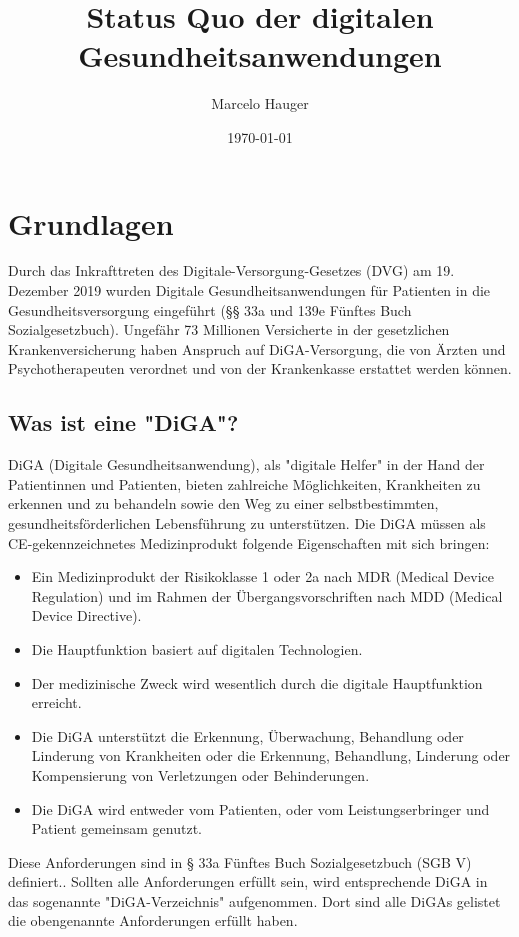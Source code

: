 \documentclass{article}
\title{Status Quo der digitalen Gesundheitsanwendungen}
\author{Marcelo Hauger}
\date{\today}
\begin{document}
	\maketitle
	\newpage
	\tableofcontents
	\newpage
	\section{Grundlagen}
		Durch das Inkrafttreten des Digitale-Versorgung-Gesetzes (DVG) am 19. Dezember 2019 wurden Digitale Gesundheitsanwendungen für Patienten in die Gesundheitsversorgung eingeführt (§§ 33a und 139e Fünftes Buch Sozialgesetzbuch). Ungefähr 73 Millionen Versicherte in der gesetzlichen Krankenversicherung haben Anspruch auf DiGA-Versorgung, die von Ärzten und Psychotherapeuten verordnet und von der Krankenkasse erstattet werden können.
		\subsection{Was ist eine "DiGA"?}
			DiGA (Digitale Gesundheitsanwendung), als "digitale Helfer" in der Hand der Patientinnen und Patienten, bieten zahlreiche Möglichkeiten, Krankheiten zu erkennen und zu behandeln sowie den Weg zu einer selbstbestimmten, gesundheitsförderlichen Lebensführung zu unterstützen. Die DiGA müssen als CE-gekennzeichnetes Medizinprodukt folgende Eigenschaften mit sich bringen:
			\begin{itemize}
				\item Ein Medizinprodukt der Risikoklasse 1 oder 2a nach MDR (Medical Device Regulation) und im Rahmen der Übergangsvorschriften nach MDD (Medical Device Directive).
				\item Die Hauptfunktion basiert auf digitalen Technologien.
				\item Der medizinische Zweck wird wesentlich durch die digitale Hauptfunktion erreicht.
				\item Die DiGA unterstützt die Erkennung, Überwachung, Behandlung oder Linderung von Krankheiten oder die Erkennung, Behandlung, Linderung oder Kompensierung von Verletzungen oder Behinderungen.
				\item Die DiGA wird entweder vom Patienten, oder vom Leistungserbringer und Patient gemeinsam genutzt.
			\end{itemize}  
			Diese Anforderungen sind in § 33a Fünftes Buch Sozialgesetzbuch (SGB V) definiert.\cite[vgl. Was ist eine DiGA?]{wissenswertes-diga}. Sollten alle Anforderungen erfüllt sein, wird entsprechende DiGA in das sogenannte "DiGA-Verzeichnis" aufgenommen. Dort sind alle DiGAs gelistet die obengenannte Anforderungen erfüllt haben.   
		\newpage
\end{document}

